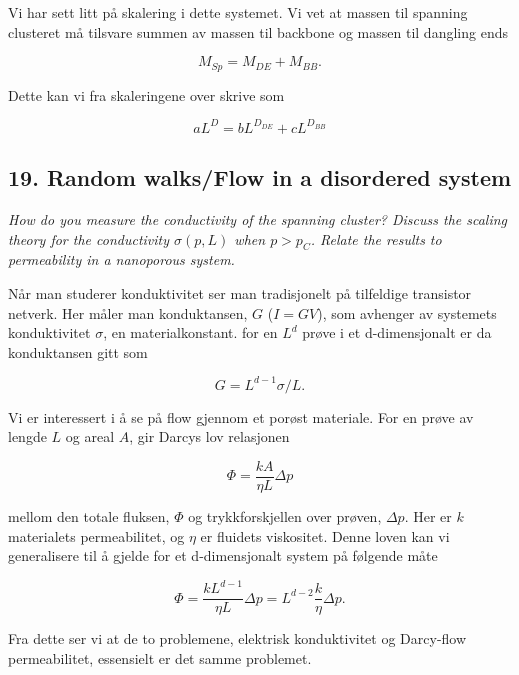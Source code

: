 \documentclass[a4paper,10pt]{article}
\begin{document}
Vi har sett litt på skalering i dette systemet. Vi vet at massen til spanning clusteret må tilsvare summen av massen til backbone og massen til dangling ends

\begin{equation}
 M_{Sp} = M_{DE} + M_{BB}.
\end{equation}

Dette kan vi fra skaleringene over skrive som

\begin{equation}
 aL^D = bL^{D_{DE}} + cL^{D_{BB}}
\end{equation}


\subsection*{19. Random walks/Flow in a disordered system}
\textit{How do you measure the conductivity of the spanning cluster? Discuss the
scaling theory for the conductivity $\sigma(p, L)$ when $p > p_C$. Relate the results to
permeability in a nanoporous system.}

Når man studerer konduktivitet ser man tradisjonelt på tilfeldige transistor netverk. Her måler man konduktansen, $G$ ($I=GV$), som avhenger av systemets konduktivitet $\sigma$, en materialkonstant. for en $L^d$ prøve i et d-dimensjonalt er da konduktansen gitt som

\begin{equation}
 G = L^{d-1}\sigma/L.
\end{equation}

Vi er interessert i å se på flow gjennom et porøst materiale. For en prøve av lengde $L$ og areal $A$, gir Darcys lov relasjonen

\begin{equation}
 \Phi = \frac{kA}{\eta L}\Delta p
\end{equation}

mellom den totale fluksen, $\Phi$ og trykkforskjellen over prøven, $\Delta p$. Her er $k$ materialets permeabilitet, og $\eta$ er fluidets viskositet. Denne loven kan vi generalisere til å gjelde for et d-dimensjonalt system på følgende måte

\begin{equation}
 \Phi = \frac{kL^{d-1}}{\eta L}\Delta p = L^{d-2}\frac{k}{\eta}\Delta p.
\end{equation}

Fra dette ser vi at de to problemene, elektrisk konduktivitet og Darcy-flow permeabilitet, essensielt er det samme problemet. 
\end{document}
